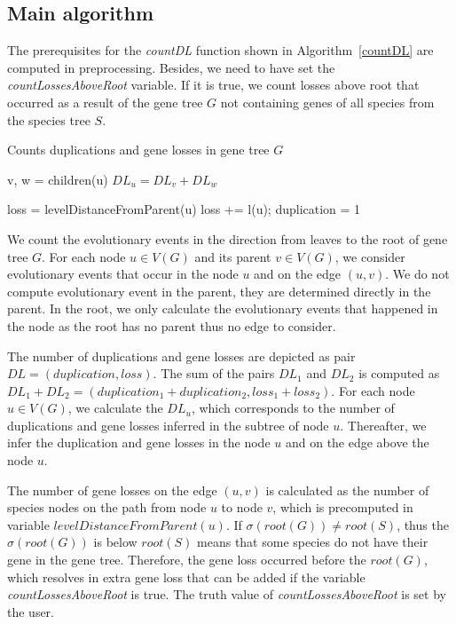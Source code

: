 \subsection{Main algorithm} \label{main_algorithm}

The prerequisites for the \emph{countDL} function shown in Algorithm~\ref{countDL} are computed in preprocessing. Besides, we need to have set the \emph{countLossesAboveRoot} variable. If it is true, we count losses above root that occurred as a result of the gene tree $G$ not containing genes of all species from the species tree $S$. 

\begin{algorithm}
\caption{Counts duplications and gene losses in gene tree $G$} 
\label{countDL}
\begin{algorithmic}[1]
		\State v, w = children(u)
		\State $DL_u = DL_v+DL_w$
	\EndIf

	\State loss = levelDistanceFromParent(u)
		\State loss += l(u); 
	\EndIf
		\State duplication = 1
	\EndIf
	
\EndFunction
\end{algorithmic}
\end{algorithm}

We count the evolutionary events in the direction from leaves to the root of gene tree $G$. For each node $u \in V(G)$ and its parent $v \in V(G)$, we consider evolutionary events that occur in the node $u$ and on the edge $(u, v)$. We do not compute evolutionary event in the parent, they are determined directly in the parent. In the root, we only calculate the evolutionary events that happened in the node as the root has no parent thus no edge to consider.

The number of duplications and gene losses are depicted as pair $DL = (duplication, loss)$. The sum of the pairs $DL_1$  and $DL_2$ is computed as $DL_1+DL_2=(duplication_1+duplication_2, loss_1+loss_2)$. For each node $u \in V(G)$, we calculate the $DL_u$, which corresponds to the number of duplications and gene losses inferred in the subtree of node $u$. Thereafter, we infer the duplication and gene losses in the node $u$ and on the edge above the node $u$.

The number of gene losses on the edge $(u, v)$ is calculated as the number of species nodes on the path from node $u$ to node $v$, which is precomputed in variable $levelDistanceFromParent(u)$. If $\sigma(root(G)) \ne root(S)$, thus the $\sigma(root(G))$ is below $root(S)$ means that some species do not have their gene in the gene tree. Therefore, the gene loss occurred before the $root(G)$, which resolves in extra gene loss that can be added if the variable \emph{countLossesAboveRoot} is true. The truth value of \emph{countLossesAboveRoot} is set by the user.

